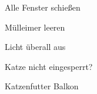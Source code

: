 

\begin{ONEitemize}
    \item{Alle Fenster schießen}
    \item{Mülleimer leeren}
    \item{Licht überall aus}
    \item{Katze nicht eingesperrt?}
    \item{Katzenfutter Balkon}
\end{ONEitemize}
